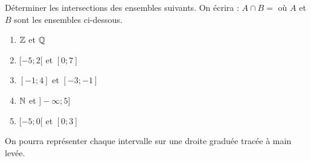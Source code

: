 
Déterminer les intersections des ensembles suivants. On écrira : $A \cap B = $ où $A$ et $B$ sont les ensembles ci-dessous.
\begin{enumerate}
\item $\mathbb Z$ et $\mathbb Q$
\item $[-5;2[$ et $[0;7]$
\item $[-1;4]$ et $[-3;-1]$
\item $\mathbb N$ et $]-\infty;5]$
\item $[-5;0[$ et $[0;3]$
\end{enumerate}

On pourra représenter chaque intervalle sur une droite graduée tracée à main levée.